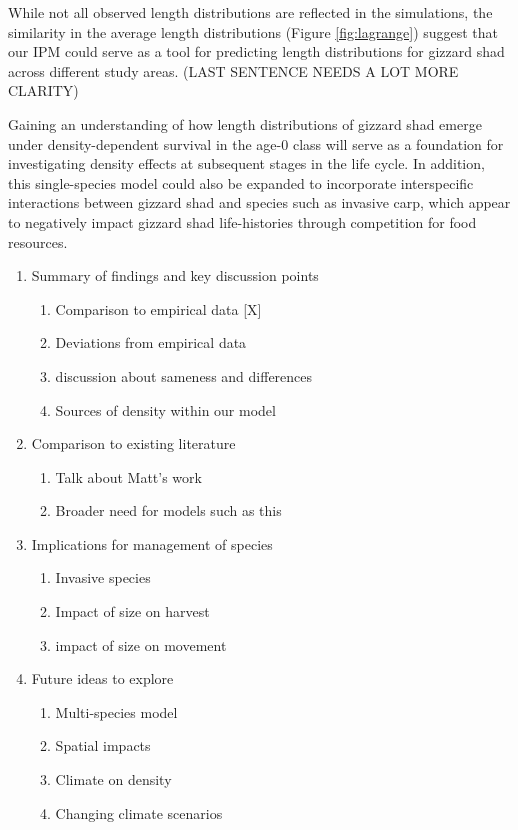 \documentclass[preprint,review,12pt,authoryear]{elsarticle}
\begin{document}
While not all observed length distributions are reflected in the simulations, the similarity in the average length distributions (Figure \ref{fig:lagrange}) suggest that our IPM could serve as a tool for predicting length distributions for gizzard shad across different study areas. (LAST SENTENCE NEEDS A LOT MORE CLARITY)

Gaining an understanding of how length distributions of gizzard shad emerge under density-dependent survival in the age-0 class will serve as a foundation for investigating density effects at subsequent stages in the life cycle.  
In addition, this single-species model could also be expanded to incorporate interspecific interactions between gizzard shad and species such as invasive carp, which appear to negatively impact gizzard shad life-histories through competition for food resources.   

\begin{enumerate}
\item Summary of findings and key discussion points
  \begin{enumerate}
  \item Comparison to empirical data [X]
  \item Deviations from empirical data
  \item discussion about sameness and differences 
  \item Sources of density within our model
  \end{enumerate}
\item Comparison to existing literature
  \begin{enumerate}
  \item Talk about Matt's work \citep{catalano2010size,
      catalano2011whole}
  \item Broader need for models such as this
  \end{enumerate}
\item Implications for management of species
  \begin{enumerate}
  \item Invasive species
  \item Impact of size on harvest
  \item impact of size on movement
  \end{enumerate}
\item Future ideas to explore
  \begin{enumerate}
  \item Multi-species model
  \item Spatial impacts
  \item Climate on density
  \item Changing climate scenarios
  \end{enumerate}
\end{enumerate}%
\end{document}
